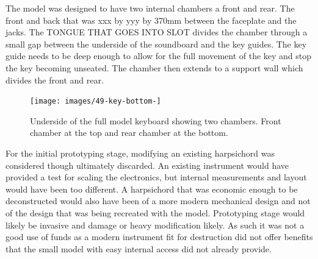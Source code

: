 

The model was designed to have two internal chambers a front and rear.
The front and back that was xxx by yyy by 370mm between the faceplate
and the jacks. The TONGUE THAT GOES INTO SLOT divides the chamber through
a small gap between the underside of the soundboard and the key guides.
The key guide needs to be deep enough to allow for the full movement of
the key and stop the key becoming unseated. The chamber then extends to
a support wall which divides the front and rear.



\begin{figure}  
  \centering
  \texttt{[image: images/49-key-bottom-]} 
  \caption{Underside of the full model keyboard showing two chambers. Front chamber at the top and rear chamber at the bottom.} 
  \Description{} 
  \label{fig:49-key-bottom}
\end{figure}


For the initial prototyping stage, modifying an existing harpsichord was
considered though ultimately discarded. An existing instrument would
have provided a test for scaling the electronics, but internal
measurements and layout would have been too different. A harpsichord that
was economic enough to be deconstructed would also have been of a more
modern mechanical design and not of the design that was being recreated
with the model. Prototyping stage would likely be invasive and damage or
heavy modification likely. As such it was not a good use of funds as a
modern instrument fit for destruction did not offer benefits that the
small model with easy internal access did not already provide.

